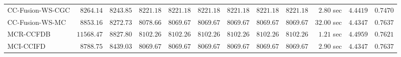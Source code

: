 \begin{table}[H]
\begin{tabular}{lrrrrrrrrrrr}
    CC-Fusion-WS-CGC & $      8264.14$ & $      8243.85$ & $      8221.18$ & $      8221.18$ & $      8221.18$ & $      8221.18$ & $      8221.18$ & $      8221.18$ & $         2.80$ sec    & $       4.4419$  & $       0.7470$ \\ 
     CC-Fusion-WS-MC & $      8853.16$ & $      8272.73$ & $      8078.66$ & $      8069.67$ & $      8069.67$ & $      8069.67$ & $      8069.67$ & $      8069.67$ & $        32.00$ sec    & $       4.4347$  & $       0.7637$ \\ 
\cmidrule{1-1} 
           MCR-CCFDB & $     11568.47$ & $      8827.80$ & $      8102.26$ & $      8102.26$ & $      8102.26$ & $      8102.26$ & $      8102.26$ & $      8102.26$ & $         1.21$ sec    & $       4.4959$  & $       0.7621$ \\ 
\cmidrule{1-1} 
           MCI-CCIFD & $      8788.75$ & $      8439.03$ & $      8069.67$ & $      8069.67$ & $      8069.67$ & $      8069.67$ & $      8069.67$ & $      8069.67$ & $         2.90$ sec    & $       4.4347$  & $       0.7637$ \\ 
\bottomrule
\end{tabular}
\end{table}

